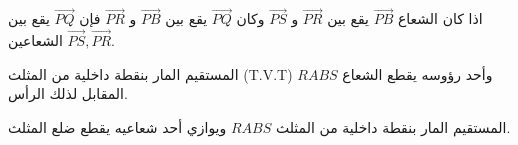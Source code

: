 \begin{theorem}
	اذا كان الشعاع 
	$\overrightarrow{PB}$ يقع بين $\overrightarrow{PR}$ و $\overrightarrow{PS}$ وكان $\overrightarrow{PQ}$ يقع بين $\overrightarrow{PB}$ و $\overrightarrow{PR}$ فإن $\overrightarrow{PQ}$ يقع بين الشعاعين $\overrightarrow{PS} , \overrightarrow{PR}$.
\end{theorem}

\begin{theorem}
	\begin{tasks}
		\item المستقيم المار بنقطة داخلية من المثلث (T.V.T) $RABS$ وأحد رؤوسه يقطع الشعاع المقابل لذلك الرأس.
		
		\item المستقيم المار بنقطة داخلية من المثلث $RABS$ ويوازي أحد شعاعيه يقطع ضلع المثلث.
	\end{tasks}
\end{theorem}
